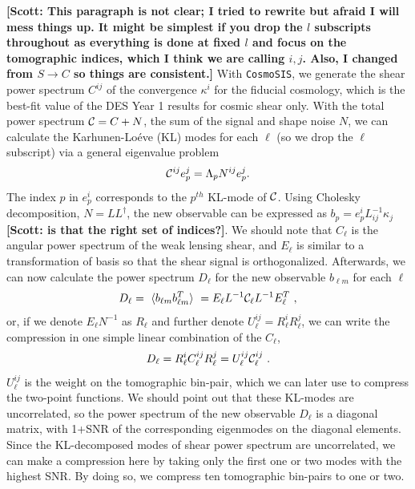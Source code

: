 \documentclass[twocolumn]{\docclass}
\newcommand\be{\begin{equation}}
\newcommand\ee{\end{equation}}
\newcommand\scott[1]{{\bf [Scott: #1]}}
\begin{document}
	
	\scott{This paragraph is not clear; I tried to rewrite but afraid I will mess things up. It might be simplest if you drop the $l$ subscripts throughout as everything is done at fixed $l$ and focus on the tomographic indices, which I think we are calling $i,j$. Also, I changed from $S\rightarrow C$ so things are consistent.} With  {\tt CosmoSIS}, we generate the shear power spectrum $C^{ij}$ of the convergence $\kappa^i$ for the fiducial cosmology, which is the best-fit value of the DES Year 1 results for cosmic shear only. With the total power spectrum $\mathcal{C}=C+N$, the sum of the signal and shape noise $N$, we can calculate the Karhunen-Lo\'eve (KL) modes for each $\ell$ (so we drop the $\ell$ subscript) via a general eigenvalue problem 
	\be
	\ctot^{ij} e^j_p = \Lambda_p N^{ij} e^j_p
	.\ee
	The index $p$ in $e_p^i$ corresponds to the $p^{th}$ KL-mode of $\mathcal{C}$. Using Cholesky decomposition, $N = L L^{\dagger}$, the new observable can be expressed as $b_p = e_p^i  L^{-1}_{ij} \kappa_{j}$\scott{is that the right set of indices?}. We should note that $C_{\ell}$ is the angular power spectrum of the weak lensing shear, and $E_{\ell}$ is similar to a transformation of basis so that the shear signal is orthogonalized. Afterwards, we can now calculate the power spectrum $D_{\ell}$ for the new observable $b_{\ell m}$ for each $\ell$
	\be
	D_{\ell} =\ \langle b_{\ell m} b_{\ell m}^T \rangle \ = E_{\ell} L^{-1} \ctot_{\ell} L^{-1} E^{T}_{\ell}\
	,\ee
	or, if we denote $E_{\ell} N^{-1}$ as $R_{\ell}$ and further denote $U_{\ell}^{ij}=R^i_{\ell} R^j_{\ell}$, we can write the compression in one simple linear combination of the $C_{\ell}$,
	\be
	D_{\ell} = R_{\ell}^i C_{\ell}^{ij} R_{\ell}^j = U_{\ell}^{ij} \ctot_{\ell}^{ij}\
	.\ee
	$U_{\ell}^{ij}$ is the weight on the tomographic bin-pair, which we can later use to compress the two-point functions. We should point out that these KL-modes are uncorrelated, so the power spectrum of the new observable $D_{\ell}$ is a diagonal matrix, with 1+SNR of the corresponding eigenmodes on the diagonal elements. Since the KL-decomposed modes of shear power spectrum are uncorrelated, we can make a compression here by taking only the first one or two modes with the highest SNR. By doing so, we compress ten tomographic bin-pairs to one or two.
	
\end{document}
